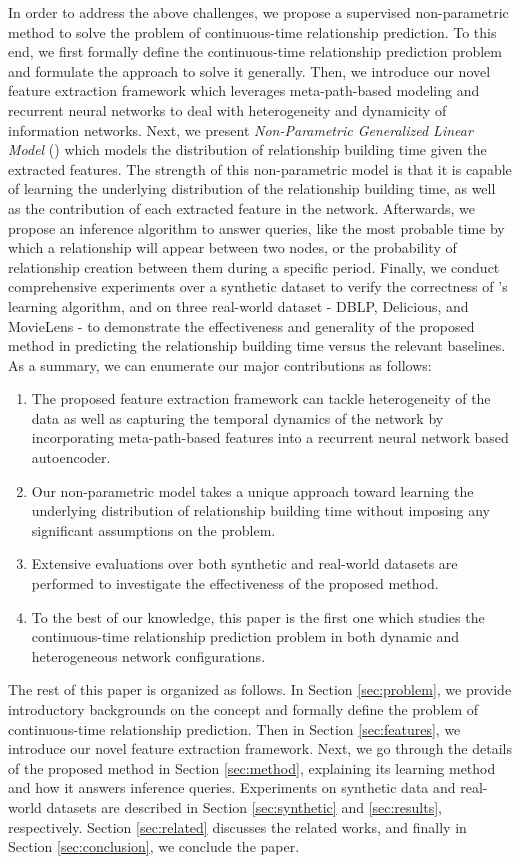 In order to address the above challenges, we propose a supervised non-parametric method to solve the problem of continuous-time relationship prediction. To this end, we first formally define the continuous-time relationship prediction problem and formulate the approach to solve it generally. Then, we introduce our novel feature extraction framework which leverages meta-path-based modeling and recurrent neural networks to deal with heterogeneity and dynamicity of information networks. Next, we present \emph{Non-Parametric Generalized Linear Model} (\npglm) which models the distribution of relationship building time given the extracted features. The strength of this non-parametric model is that it is capable of learning the underlying distribution of the relationship building time, as well as the contribution of each extracted feature in the network. Afterwards, we propose an inference algorithm to answer queries, like the most probable time by which a relationship will appear between two nodes, or the probability of relationship creation between them during a specific period. Finally, we conduct comprehensive experiments over a synthetic dataset to verify the correctness of \npglm's learning algorithm, and on three real-world dataset - DBLP, Delicious, and MovieLens - to demonstrate the effectiveness and generality of the proposed method in predicting the relationship building time versus the relevant baselines. As a summary, we can enumerate our major contributions as follows:

\begin{enumerate}[label=(\roman*)]
\item The proposed feature extraction framework can tackle heterogeneity of the data as well as capturing the temporal dynamics of the network by incorporating meta-path-based features into a recurrent neural network based autoencoder.
\item Our non-parametric model takes a unique approach toward learning the underlying distribution of relationship building time without imposing any significant assumptions on the problem.
\item Extensive evaluations over both synthetic and real-world datasets are performed to investigate the effectiveness of the proposed method. 
\item To the best of our knowledge, this paper is the first one which studies the continuous-time relationship prediction problem in both dynamic and heterogeneous network configurations.
\end{enumerate}

The rest of this paper is organized as follows. In Section \ref{sec:problem}, we provide introductory backgrounds on the concept and formally define the problem of continuous-time relationship prediction. Then in Section \ref{sec:features}, we introduce our novel feature extraction framework. Next, we go through the details of the proposed \npglm method in Section \ref{sec:method}, explaining its learning method and how it answers inference queries. Experiments on synthetic data and real-world datasets are described in Section \ref{sec:synthetic} and \ref{sec:results}, respectively. Section \ref{sec:related} discusses the related works, and finally in Section \ref{sec:conclusion}, we conclude the paper.
